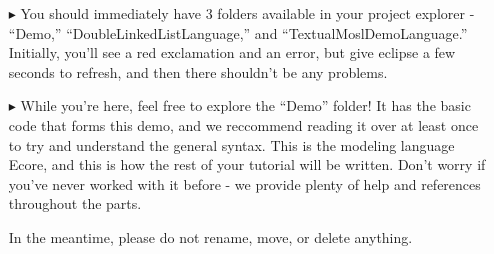 \newpage
\texHeader

\begin{itemize}
\FloatBarrier
\item[$\blacktriangleright$] You should immediately have 3 folders available in your project explorer - ``Demo,'' ``DoubleLinkedListLanguage,'' and ``TextualMoslDemoLanguage.'' Initially, you'll see a red exclamation and an error, but give eclipse a few seconds to refresh, and then there shouldn't be any problems.  

\item[$\blacktriangleright$] While you're here, feel free to explore the ``Demo'' folder! It has the basic code that forms this demo, and we reccommend reading it over at least once to try and understand the general syntax. This is the modeling language Ecore, and this is how the rest of your tutorial will be written. Don't worry if you've never worked with it before - we provide plenty of help and references throughout the parts. 

In the meantime, please do not rename, move, or delete anything.
\end{itemize}